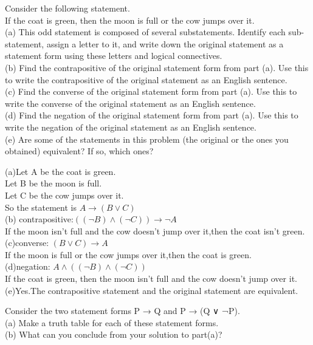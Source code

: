 \documentclass[11pt, a4paper, UTF8]{ctexart}
\begin{document}
\begin{problem}[UD:3.7]
Consider the following statement.\\
If the coat is green, then the moon is full or the cow jumps over it.\\
(a) This odd statement is composed of several substatements. Identify each sub- statement, assign a letter to it, and write down the original statement as a statement form using these letters and logical connectives.\\
(b) Find the contrapositive of the original statement form from part (a). Use this to write the contrapositive of the original statement as an English sentence.\\
(c) Find the converse of the original statement form from part (a). Use this to write the converse of the original statement as an English sentence.\\
(d) Find the negation of the original statement form from part (a). Use this to write the negation of the original statement as an English sentence.\\
(e) Are some of the statements in this problem (the original or the ones you obtained) equivalent? If so, which ones?

\end{problem}

\begin{solution}
(a)Let A be the coat is green.\\
Let B be the moon is full.\\
Let C be the cow jumps over it.\\
So the statement is $A \rightarrow (B \vee C) $\\
(b) contrapositive:$((\neg B)\wedge(\neg C)) \rightarrow \neg A$\\
If the moon isn't full and the cow doesn't jump over it,then the coat isn't green.\\
(c)converse: $(B \vee C) \rightarrow A$\\
If the moon is full or the cow jumps over it,then the coat is green.\\
(d)negation: $A \wedge ((\neg B)\wedge(\neg C))$\\
If the coat is green, then the moon isn't full and the cow doesn't jump over it.\\
(e)Yes.The contrapositive statement and the original statement are equivalent.
\end{solution}


\begin{problem}[UD:3.8]
Consider the two statement forms P → Q and P → (Q ∨ ¬P).\\
(a) Make a truth table for each of these statement forms.\\
(b) What can you conclude from your solution to part(a)?\\
\end{problem}
\end{document}
